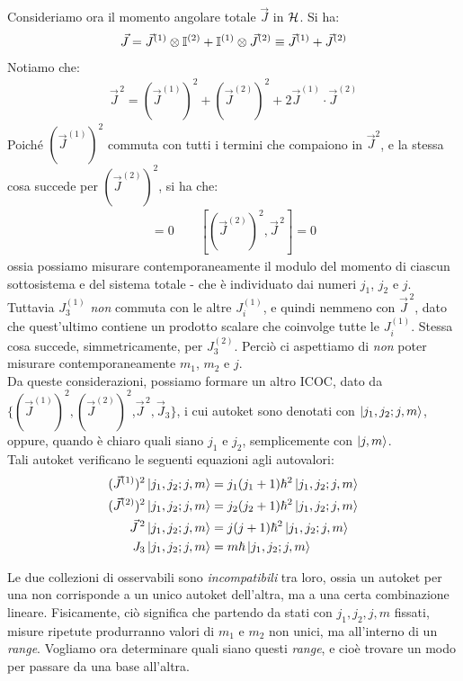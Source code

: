 \documentclass[../../FisicaTeorica.tex]{subfiles}
\begin{document}
Consideriamo ora il momento angolare totale $\vec{J}$ in $\mathcal{H}$. Si ha:
\begin{align*}
\vec{J} = \vec{J}^{(1)}\otimes \mathbb{I}^{(2)} + \mathbb{I}^{(1)} \otimes \vec{J}^{(2)} \equiv \vec{J}^{(1)}+\vec{J}^{(2)}
\end{align*}
Notiamo che:
\begin{align*}
\vec{J}^{\,2} = (\vec{J}^{(1)})^2 + (\vec{J}^{(2)})^2 + 2\vec{J}^{(1)}\cdot \vec{J}^{(2)}
\end{align*}
Poiché $(\vec{J}^{(1)})^2$ commuta con tutti i termini che compaiono in $\vec{J}^2$, e la stessa cosa succede per $(\vec{J}^{(2)})^2$, si ha che:
\begin{align*}
[(\vec{J}^{(1)})^2, \vec{J}^{\,2}]=0 \qquad [(\vec{J}^{(2)})^2, \vec{J}^{\,2}]=0
\end{align*}
ossia possiamo misurare contemporaneamente il modulo del momento di ciascun sottosistema e del sistema totale - che è individuato dai numeri $j_1$, $j_2$ e $j$. Tuttavia $J_3^{(1)}$ \textit{non} commuta con le altre $J_i^{(1)}$, e quindi nemmeno con $\vec{J}^{\,2}$, dato che quest'ultimo contiene un prodotto scalare che coinvolge tutte le $J^{(1)}_i$. Stessa cosa succede, simmetricamente, per $J_3^{(2)}$. Perciò ci aspettiamo di \textit{non} poter misurare contemporaneamente $m_1$, $m_2$ e $j$.\\
Da queste considerazioni, possiamo formare un altro ICOC, dato da $\{(\vec{J}^{(1)})^2, (\vec{J}^{(2)})^2$,$\vec{J}^{\,2}, \vec{J}_3\}$, i cui autoket sono denotati con $\Ket{j_1, j_2; j, m}$, oppure, quando è chiaro quali siano $j_1$ e $j_2$, semplicemente con $\Ket{j,m}$.\\
Tali autoket verificano le seguenti equazioni agli autovalori:
\begin{align*}
(\vec{J}^{(1)})^2 \Ket{j_1, j_2; j,m} &= j_1(j_1+1)\hbar^2 \Ket{j_1, j_2; j,m}\\
(\vec{J}^{(2)})^2 \Ket{j_1, j_2; j,m} &= j_2(j_2 + 1) \hbar^2 \Ket{j_1, j_2; j,m}\\
\vec{J}^{\,2} \Ket{j_1, j_2; j,m} &= j(j+1)\hbar^2 \Ket{j_1, j_2; j,m}\\
{J}_3 \Ket{j_1, j_2; j, m} &= m\hbar \Ket{j_1, j_2; j, m}
\end{align*}

Le due collezioni di osservabili sono \textit{incompatibili} tra loro, ossia un autoket per una non corrisponde a un unico autoket dell'altra, ma a una certa combinazione lineare. Fisicamente, ciò significa che partendo da stati con $j_1, j_2, j, m$ fissati, misure ripetute produrranno valori di $m_1$ e $m_2$ non unici, ma all'interno di un \textit{range}. Vogliamo ora determinare quali siano questi \textit{range}, e cioè trovare un modo per passare da una base all'altra.\\
\end{document}
